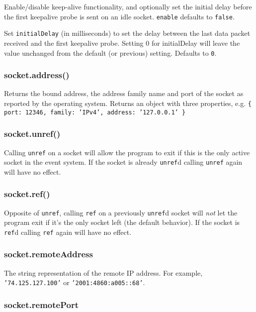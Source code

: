 Enable/disable keep-alive functionality, and optionally set the initial
delay before the first keepalive probe is sent on an idle socket.
\texttt{enable} defaults to \texttt{false}.

Set \texttt{initialDelay} (in milliseconds) to set the delay between the
last data packet received and the first keepalive probe. Setting 0 for
initialDelay will leave the value unchanged from the default (or
previous) setting. Defaults to \texttt{0}.

\subsubsection{socket.address()}

Returns the bound address, the address family name and port of the
socket as reported by the operating system. Returns an object with three
properties, e.g.
\texttt{\{ port: 12346, family: 'IPv4', address: '127.0.0.1' \}}

\subsubsection{socket.unref()}

Calling \texttt{unref} on a socket will allow the program to exit if
this is the only active socket in the event system. If the socket is
already \texttt{unref}d calling \texttt{unref} again will have no
effect.

\subsubsection{socket.ref()}

Opposite of \texttt{unref}, calling \texttt{ref} on a previously
\texttt{unref}d socket will \emph{not} let the program exit if it's the
only socket left (the default behavior). If the socket is \texttt{ref}d
calling \texttt{ref} again will have no effect.

\subsubsection{socket.remoteAddress}

The string representation of the remote IP address. For example,
\texttt{'74.125.127.100'} or \texttt{'2001:4860:a005::68'}.

\subsubsection{socket.remotePort}

